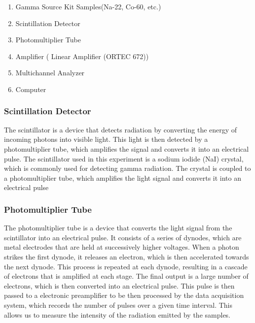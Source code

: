\documentclass[12pt]{article}
\begin{document}
                        \begin{enumerate}
                                \item Gamma Source Kit Samples(Na-22, Co-60, etc.)
                                \item Scintillation Detector
                                \item Photomultiplier Tube
                                \item Amplifier ( Linear Amplifier (ORTEC 672))
                                \item Multichannel Analyzer
                                \item Computer
                        \end{enumerate}
                        
                \subsubsection{Scintillation Detector}
                        The scintillator is a device that detects radiation by converting the energy of incoming
                        photons into visible light. This light is then detected by a photomultiplier tube, which
                        amplifies the signal and converts it into an electrical pulse. The scintillator used in
                        this experiment is a sodium iodide (NaI) crystal, which is commonly used for detecting
                        gamma radiation. The crystal is coupled to a photomultiplier tube, which amplifies the
                        light signal and converts it into an electrical pulse


                \subsubsection{Photomultiplier Tube}
                        The photomultiplier tube is a device that converts the light signal from the scintillator
                        into an electrical pulse. It consists of a series of dynodes, which are metal electrodes
                        that are held at successively higher voltages. When a photon strikes the first dynode, it
                        releases an electron, which is then accelerated towards the next dynode. This process is
                        repeated at each dynode, resulting in a cascade of electrons that is amplified at each stage.
                        The final output is a large number of electrons, which is then converted into an electrical
                        pulse. This pulse is then passed to a electronic preamplifier to be then processed by the
                        data acquisition system, which records the number of pulses over a given time interval.
                        This allows us to measure the intensity of the radiation emitted by the samples.
\end{document}

